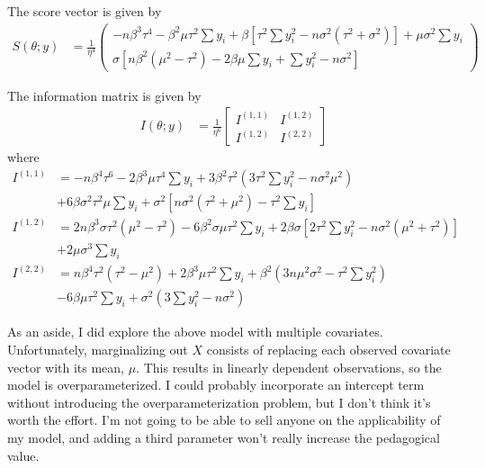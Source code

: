 \documentclass[11pt, oneside]{article}   	%
\begin{document}
\begin{appendices}
    The score vector is given by
    \begin{align}
        S(\theta; y) &= \frac{1}{\eta^4}\begin{pmatrix}
            - n \beta^3 \tau^4 - \beta^2 \mu \tau^2 \sum y_i + \beta [\tau^2 \sum y_i^2 - n \sigma^2 (\tau^2 + \sigma^2)] + \mu \sigma^2 \sum y_i\\
            \sigma[n \beta^2 (\mu^2 - \tau^2)  - 2 \beta \mu \sum y_i + \sum y_i^2 - n \sigma^2]
        \end{pmatrix}
    \end{align}

    The information matrix is given by
    \begin{align}
        I(\theta; y) &= \frac{1}{\eta^6} \begin{bmatrix}
            I^{(1,1)} & I^{(1,2)}\\
            I^{(1,2)} & I^{(2,2)}
        \end{bmatrix}
    \end{align}
    where
    \begin{align}
        I^{(1,1)} & = - n \beta^4 \tau^6 - 2 \beta^3 \mu \tau^4 \sum y_i + 3 \beta^2 \tau^2 (3 \tau^2 \sum y_i^2 - n \sigma^2 \mu^2) \\
        & + 6 \beta \sigma^2 \tau^2 \mu \sum y_i + \sigma^2 [n \sigma^2 (\tau^2 + \mu^2) - \tau^2 \sum y_i] \nonumber \\
        I^{(1,2)} &= 2 n \beta^3 \sigma \tau^2 (\mu^2 - \tau^2) - 6 \beta^2 \sigma \mu \tau^2 \sum y_i + 2 \beta \sigma [2 \tau^2 \sum y_i^2 - n \sigma^2 (\mu^2 + \tau^2)] \\
        & + 2 \mu \sigma^3 \sum y_i \nonumber \\
        I^{(2,2)} &= n \beta^4 \tau^2 (\tau^2 - \mu^2) + 2 \beta^3 \mu \tau^2 \sum y_i + \beta^2 (3 n \mu^2 \sigma^2 - \tau^2 \sum y_i^2) \\
        & - 6 \beta \mu \tau^2 \sum y_i + \sigma^2 (3 \sum y_i^2 - n \sigma^2) \nonumber
    \end{align}


    As an aside, I did explore the above model with multiple covariates. Unfortunately, marginalizing out $X$ consists of replacing each observed covariate vector with its mean, $\mu$. This results in linearly dependent observations, so the model is overparameterized. I could probably incorporate an intercept term without introducing the overparameterization problem, but I don't think it's worth the effort. I'm not going to be able to sell anyone on the applicability of my model, and adding a third parameter won't really increase the pedagogical value.


\end{appendices}
\end{document}
